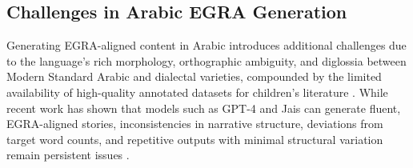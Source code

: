 \documentclass[11pt]{article}
\begin{document}
\subsection{Challenges in Arabic EGRA Generation}
Generating EGRA-aligned content in Arabic introduces additional challenges due to the language's rich morphology, orthographic ambiguity, and diglossia between Modern Standard Arabic and dialectal varieties, compounded by the limited availability of high-quality annotated datasets for children's literature \cite{habash2010introduction,abdelghafur2025tales}. While recent work has shown that models such as GPT-4 and Jais can generate fluent, EGRA-aligned stories, inconsistencies in narrative structure, deviations from target word counts, and repetitive outputs with minimal structural variation remain persistent issues \cite{abdelghafur2025tales,rai2024measuring,elshangiti2024arabic}.




\end{document}
